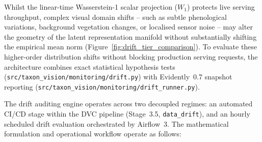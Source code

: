 Whilst the linear-time Wasserstein-1 scalar projection ($W_1$) protects live serving throughput, complex visual domain shifts -- such as subtle phenological variations, background vegetation changes, or localised sensor noise -- may alter the geometry of the latent representation manifold without substantially shifting the empirical mean norm (Figure~\ref{fig:drift_tier_comparison}). To evaluate these higher-order distribution shifts without blocking production serving requests, the architecture combines exact statistical hypothesis tests (\nolinkurl{src/taxon_vision/monitoring/drift.py}) with Evidently~0.7 snapshot reporting (\nolinkurl{src/taxon_vision/monitoring/drift_runner.py}).

The drift auditing engine operates across two decoupled regimes: an automated CI/CD stage within the DVC pipeline (Stage~3.5, \texttt{data\_drift}), and an hourly scheduled drift evaluation orchestrated by Airflow~3. The mathematical formulation and operational workflow operate as follows:


